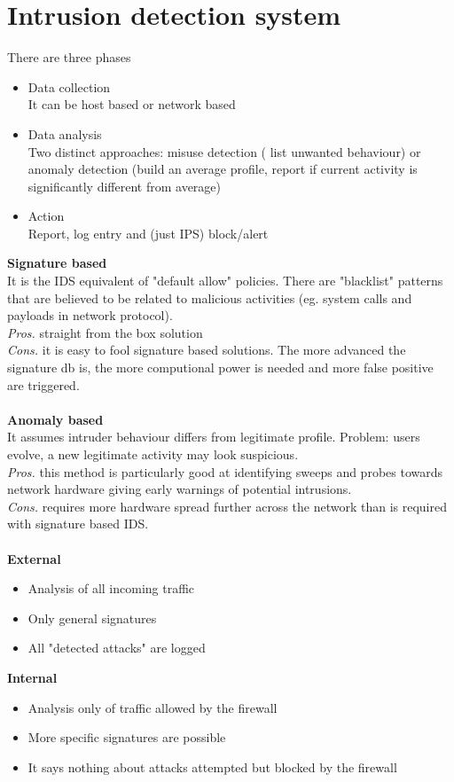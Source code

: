 \documentclass[10pt,a4paper]{book}
\begin{document}
\chapter{Intrusion detection system}
There are three phases
\begin{itemize}
\item Data collection\\
It can be host based or network based
\item Data analysis\\
Two distinct approaches: misuse detection ( list unwanted behaviour) or anomaly detection (build an average profile, report if current activity is significantly different from average)
\item Action\\
Report, log entry and (just IPS) block/alert
\end{itemize}
\textbf{Signature based}\\
It is the IDS equivalent of "default allow" policies. There are "blacklist" patterns that are believed to be related to malicious activities (eg. system calls and payloads in network protocol).\\
\emph{Pros.} straight from the box solution\\
\emph{Cons.} it is easy to fool signature based solutions. The more advanced the signature db is, the more computional power is needed and more false positive are triggered.\\\\
\textbf{Anomaly based}\\
It assumes intruder behaviour differs from legitimate profile. Problem: users evolve, a new legitimate activity may look suspicious.\\
\emph{Pros.} this method is particularly good at identifying sweeps and probes towards network hardware giving early warnings of potential intrusions.\\
\emph{Cons.} requires more hardware spread further across the network than is required with signature based IDS. \\\\
\textbf{External}
\begin{itemize}[noitemsep,nolistsep]
\item Analysis of all incoming traffic
\item Only general signatures 
\item All "detected attacks" are logged
\end{itemize}
\textbf{Internal}
\begin{itemize}[noitemsep,nolistsep]
\item Analysis only of traffic allowed by the firewall
\item More specific signatures are possible
\item It says nothing about attacks attempted but blocked by the firewall
\end{itemize}
\newpage
\end{document}

